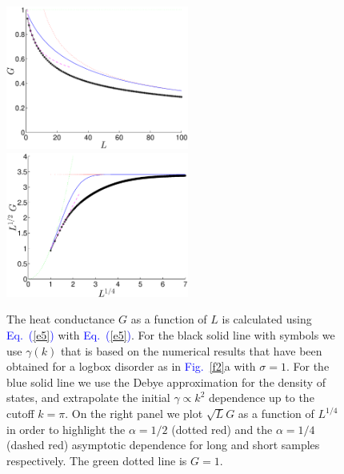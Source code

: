 \documentclass[onecolumn,fleqn,notitlepage,secnumarabic]{revtex4}
\newcommand{\Eq}[1]{\textcolor{blue}{Eq.\!\!~(\ref{#1})}}
\newcommand{\Fig}[1]{\textcolor{blue}{Fig.}\!\!~\ref{#1}}
\begin{document}
\begin{figure}[h]

\includegraphics[clip,width=6cm]{G_versus_L}
\includegraphics[clip,width=6cm]{GsqrtL_sqrtL}

\caption{
The heat conductance $G$ as a function of $L$ is calculated using \Eq{e5} with \Eq{e5}.
For the black solid line with symbols we use $\gamma(k)$ that is based on the numerical
results that have been obtained for a logbox disorder as in \Fig{f2}a with ${\sigma=1}$.  
For the blue solid line we use the Debye approximation for the density 
of states, and extrapolate the initial $\gamma\propto k^2$ dependence up to the cutoff $k=\pi$.  
%
On the right panel we plot $\sqrt{L}G$ as a function of $L^{1/4}$ 
in order to highlight the ${\alpha=1/2}$ (dotted red) and the ${\alpha=1/4}$ (dashed red)
asymptotic dependence for long and short samples respectively. 
The green dotted line is $G=1$. }

\label{f4}
\end{figure}
\end{document}
